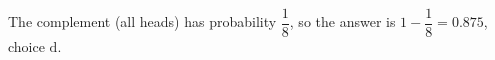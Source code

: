 The complement (all heads) has probability $\dfrac18$, so the answer is $1-\dfrac18=0.875$, choice $\boxed{\text{d}}$.
